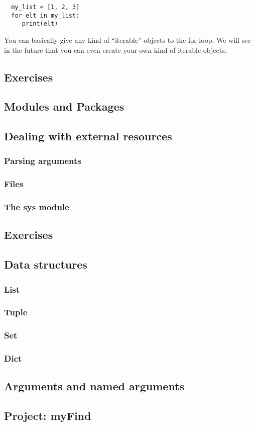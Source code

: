 \begin{lstlisting}
  my_list = [1, 2, 3]
  for elt in my_list:
     print(elt)
\end{lstlisting}

You can basically give any kind of ``iterable'' objects to the for loop. We will see in the future
that you can even create your own kind of iterable objects.

\subsection{Exercises}

\subsection{Modules and Packages}

\subsection{Dealing with external resources}
\subsubsection{Parsing arguments}
\subsubsection{Files}
\subsubsection{The sys module}

\subsection{Exercises}

\subsection{Data structures}
\subsubsection{List}
\subsubsection{Tuple}
\subsubsection{Set}
\subsubsection{Dict}

\subsection{Arguments and named arguments}

\subsection{Project: myFind}
